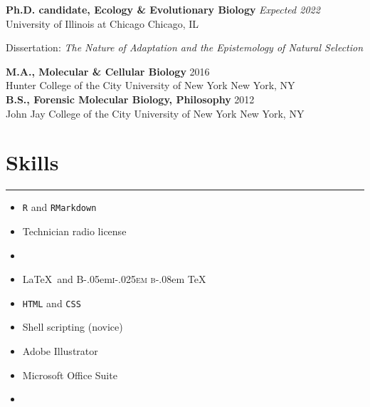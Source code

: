 \documentclass[]{article}
\begin{document}
\textbf{Ph.D. candidate, Ecology \& Evolutionary Biology} \hfill \textit{Expected 2022}\\ 
University of Illinois at Chicago \hfill Chicago, IL
     
Dissertation: \emph{The Nature of Adaptation and the Epistemology of Natural Selection} 
\vspace{0.3cm}

\textbf{M.A., Molecular \& Cellular Biology} \hfill 2016\\ 
Hunter College of the City University of New York \hfill New York, NY\\
     

\textbf{B.S., Forensic Molecular Biology, Philosophy} \hfill 2012\\ 
John Jay College of the City University of New York \hfill New York, NY

\section{Skills}
\hrule

\begin{multicols}{3}
\begin{itemize}
	\item[\textcolor{light-gray}{\faRProject}]{\texttt{R} and \texttt{RMarkdown}}
	\item[\textcolor{light-gray}{\faBroadcastTower}]{Technician radio license}
	\item[]{}
\end{itemize}

\columnbreak

\begin{itemize}
	\item[\textcolor{light-gray}{\faFilePdf}]{\LaTeX\ and \DeclareRobustCommand{\BibTeX}{%
  {\normalfont B\kern-.05em{\scshape i\kern-.025em b}\kern-.08em \TeX}%
}\BibTeX}
\item[\textcolor{light-gray}{\faFileCode}]{\texttt{HTML} and \texttt{CSS}}
\item[\textcolor{light-gray}{\faFilePrescription}]{Shell scripting (novice)}
\end{itemize}

\columnbreak

\begin{itemize}
	\item[\textcolor{light-gray}{\faDraftingCompass}]{Adobe Illustrator}
	\item[\textcolor{light-gray}{\faMicrosoft}]{Microsoft Office Suite}
	\item[]{}
\end{itemize}

\end{multicols}
\end{document}
